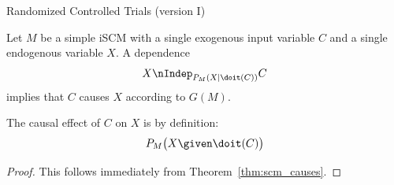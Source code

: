 \begin{frame}{Randomized Controlled Trials (version I)}
\begin{Prp}[\ref{prp:RCT1}]
Let $M$ be a simple iSCM with a single exogenous input variable $C$ and a single endogenous variable $X$.
A dependence 
  $$X \nIndep_{P_{M}(X\mid\doit(C))} C $$
implies that $C$ causes $X$ according to $G(M)$. 

The causal effect of $C$ on $X$ is by definition:
$$P_{M}\big(X \given \doit(C)\big)$$
\end{Prp}
\begin{proof}
This follows immediately from Theorem~\ref{thm:scm_causes}.
\end{proof}
\end{frame}

